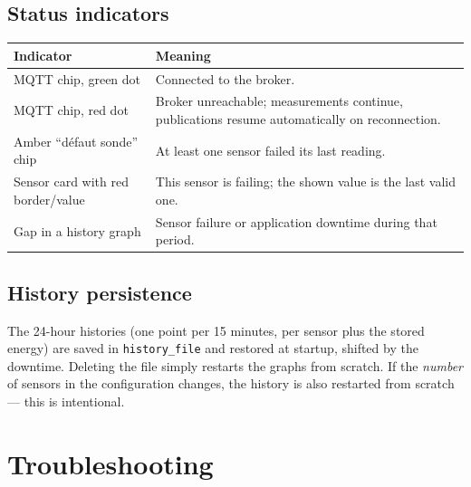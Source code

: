 \documentclass[11pt,a4paper,parskip=half]{scrartcl}
\newcommand{\code}[1]{\texttt{#1}}
\begin{document}
\subsection{Status indicators}

\begin{center}
\begin{tabularx}{\textwidth}{@{}lX@{}}
\toprule
\textbf{Indicator} & \textbf{Meaning}\\
\midrule
MQTT chip, green dot & Connected to the broker.\\
MQTT chip, red dot & Broker unreachable; measurements continue, publications resume automatically on reconnection.\\
Amber \enquote{défaut sonde} chip & At least one sensor failed its last reading.\\
Sensor card with red border/value & This sensor is failing; the shown value is the last valid one.\\
Gap in a history graph & Sensor failure or application downtime during that period.\\
\bottomrule
\end{tabularx}
\end{center}

\subsection{History persistence}

The 24-hour histories (one point per 15 minutes, per sensor plus the stored
energy) are saved in \code{history\_file} and restored at startup, shifted by
the downtime. Deleting the file simply restarts the graphs from scratch.
If the \emph{number} of sensors in the configuration changes, the history is
also restarted from scratch --- this is intentional.

\section{Troubleshooting}
\end{document}
